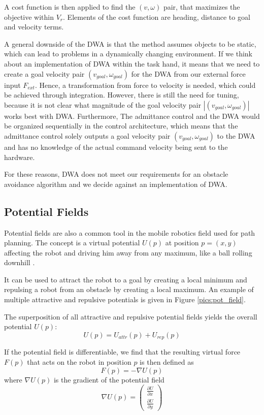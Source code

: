 A cost function is then applied to find the $(v,\omega)$ pair, that maximizes the objective within $V_r$. Elements of the cost function are heading, distance to goal and velocity terms.

A general downside of the DWA is that the method assumes objects to be static, which can lead to problems in a dynamically changing environment. If we think about an implementation of DWA within the task hand, it means that we need to create a goal velocity pair $(v_{goal},\omega_{goal})$ for the DWA from our external force input $F_{ext}$. Hence, a transformation from force to velocity is needed, which could be achieved through integration. However, there is still the need for tuning, because it is not clear what magnitude of the goal velocity pair $|(v_{goal},\omega_{goal})|$ works best with DWA. Furthermore, The admittance control and the DWA would be organized sequentially in the control architecture, which means that the admittance control solely outputs a goal velocity pair $(v_{goal},\omega_{goal})$ to the DWA and has no knowledge of the actual command velocity being sent to the hardware.

For these reasons, DWA does not meet our requirements for an obstacle avoidance algorithm and we decide against an implementation of DWA.


\subsection{Potential Fields}
	\label{sec:pot_field}
Potential fields are also a common tool in the mobile robotics field used for path planning. The concept is a virtual potential $U(p)$ at position $p = (x,y)$ affecting the robot and driving him away from any maximum, like a ball rolling downhill \citep{siegwart2004autonomous}.

It can be used to attract the robot to a goal by creating a local minimum and repulsing a robot from an obstacle by creating a local maximum. An example of multiple attractive and repulsive potentials is given in Figure \ref{pics:pot_field}.

The superposition of all attractive and repulsive potential fields yields the overall potential $U(p)$:
\begin{equation}
U(p) = U_{attr}(p) + U_{rep}(p)
	\label{eq:pot_field}
\end{equation}

If the potential field is differentiable, we find that the resulting virtual force $F(p)$ that acts on the robot in position $p$ is then defined as 
\begin{equation}
F(p) = - \nabla U(p) 
	\label{eq:pot_force}
\end{equation}
where $\nabla U(p)$ is the gradient of the potential field
\begin{equation}
\nabla U(p) = \begin{pmatrix}
\frac{\partial U}{\partial x} \\
\frac{\partial U}{\partial y}
\end{pmatrix}
	\label{eq:gradient}
\end{equation}

